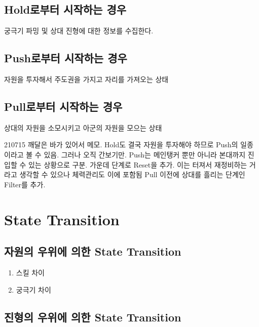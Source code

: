 \subsection{Hold로부터 시작하는 경우}
궁극기 파밍 및 상대 진형에 대한 정보를 수집한다.
\subsection{Push로부터 시작하는 경우}
자원을 투자해서 주도권을 가지고 자리를 가져오는 상태
\subsection{Pull로부터 시작하는 경우}
상대의 자원을 소모시키고 아군의 자원을 모으는 상태


210715 깨달은 바가 있어서 메모.
Hold도 결국 자원을 투자해야 하므로 Push의 일종이라고 볼 수 있음. 그러나 오직 간보기만.
Push는 메인탱커 뿐만 아니라 본대까지 진입할 수 있는 상황으로 구분.
가운데 단계로 Reset을 추가. 이는 터져서 재정비하는 거라고 생각할 수 있으나 체력관리도 이에 포함됨
Pull 이전에 상대를 흘리는 단계인 Filter를 추가.



\section{State Transition}
\subsection{자원의 우위에 의한 State Transition}
\begin{enumerate}
    \item 스킬 차이
    \item 궁극기 차이
\end{enumerate}
\subsection{진형의 우위에 의한 State Transition} 